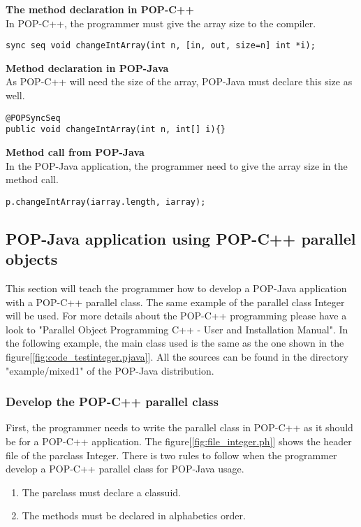 \textbf{The method declaration in POP-C++}\\
In POP-C++, the programmer must give the array size to the compiler.
\begin{lstlisting}
sync seq void changeIntArray(int n, [in, out, size=n] int *i);
\end{lstlisting}\s

\textbf{Method declaration in POP-Java}\\
As POP-C++ will need the size of the array, POP-Java must declare this size as well.
\begin{lstlisting}
@POPSyncSeq
public void changeIntArray(int n, int[] i){}
\end{lstlisting}\s

\textbf{Method call from POP-Java}\\
In the POP-Java application, the programmer need to give the array size in the method call.
\begin{lstlisting}
p.changeIntArray(iarray.length, iarray);
\end{lstlisting}



\pagebreak
\subsection{POP-Java application using POP-C++ parallel objects}
This section will teach the programmer how to develop a POP-Java application with a POP-C++ parallel class. The same example of the parallel class Integer will be used.  For more details about the POP-C++ programming please have a look to "Parallel Object Programming C++ - User and Installation Manual"\cite{popc_intro}. In the following example, the main class used is the same as the one shown in the figure[\ref{fig:code_testinteger.pjava}]. All the sources can be found in the directory "example/mixed1" of the POP-Java distribution.

\subsubsection{Develop the POP-C++ parallel class}
First, the programmer needs to write the parallel class in POP-C++ as it should be for a POP-C++ application. The figure[\ref{fig:file_integer.ph}] shows the header file of the parclass Integer. There is two rules to follow when the programmer develop a POP-C++ parallel class for POP-Java usage.
\begin{enumerate}
\item The parclass must declare a classuid.
\item The methods must be declared in alphabetics order.
\end{enumerate}


